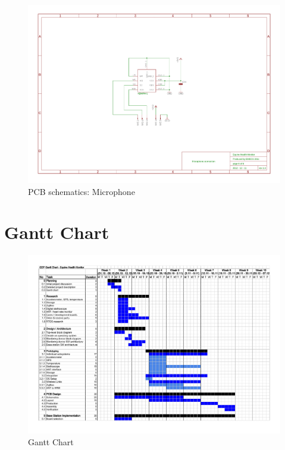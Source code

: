 \begin{figure}[htb]
\centering
\includegraphics[width=\columnwidth]{Images/pcb_mic}
\caption{PCB schematics: Microphone}
\label{fig:pcb_schematics_5}
\end{figure}






\clearpage
\section{Gantt Chart}
\label{sec:gantt_chart}
\begin{figure}[htb]
\centering
\includegraphics[angle=90, width=0.9\columnwidth]{Data/gantt_chart}
\caption{Gantt Chart}
\label{fig:gantt_chart}
\end{figure}
\clearpage


